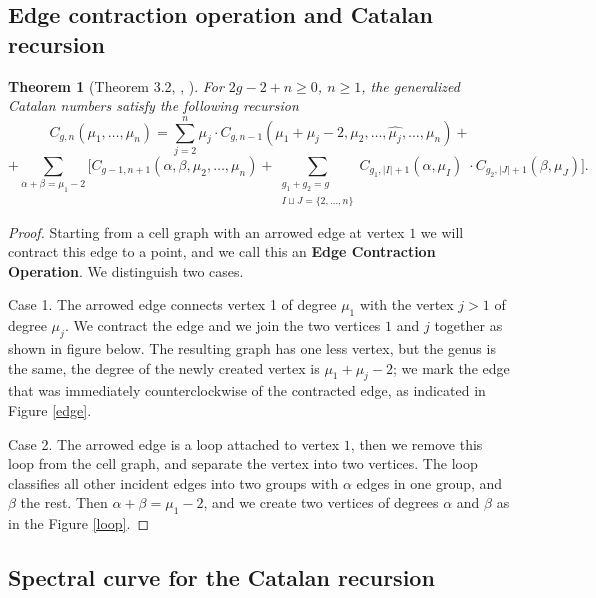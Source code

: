 \documentclass[oneside, 11pt]{amsart}
\newtheorem{thm}{Theorem}[section]
\theoremstyle{definition}
\numberwithin{equation}{subsection}
\def\a{\alpha}
\def\b{\beta}
\begin{document}
\subsection{Edge contraction operation and Catalan recursion}\label{eca cat}
\begin{thm}[Theorem 3.2, \cite{OD6}, \cite{WL}]\label{catalan}
For $2g-2+n\geq 0$, $n\geq 1$, the generalized Catalan numbers satisfy the following recursion
$$C_{g,n}(\mu_1,\dots,\mu_n)=
\sum_{j=2} ^n \mu_j \cdot C_{g,n-1}
(\mu_1+\mu_j-2,\mu_2,\dots,\widehat{\mu_j},
\dots,
\mu_n)+
$$
$$
+
\sum_{\a+\b = \mu_1-2}
\Bigg[
C_{g-1,n+1}(\a,\b,\mu_2,\dots,\mu_n)
+
\sum_{\substack{g_1+g_2=g\\I\sqcup J=\{2,\dots,n\}}}
C_{g_1,|I|+1}(\a,\mu_I)\; \cdot C_{g_2,|J|+1}(\b,\mu_J)
\Bigg].
$$
\end{thm}
\begin{proof} Starting from a cell graph with an arrowed edge at vertex $1$ we will contract this edge to a point, and we call this an \textbf{Edge Contraction Operation}.  We distinguish two cases.

Case 1. The arrowed edge connects vertex 1 of degree $\mu_1$ with the vertex $j > 1$ of degree $\mu_j$. We contract the edge and we join the two vertices $1$ and $j$ together as shown in figure below.
The resulting graph has one less vertex, but the genus is the same, the degree of the newly created vertex is $\mu_{1} + \mu_{j} - 2$; we mark the edge that was immediately
counterclockwise of the contracted edge, as indicated in Figure \ref{edge}.

\begin{figure}[h]
\centering
{}%
\qquad
{}%
\caption{}
\end{figure}


Case 2. The arrowed edge is a loop attached to vertex $1$, then we remove this loop from the cell graph, and separate the vertex into two vertices. The loop classifies all other incident edges into two groups with $\alpha$ edges in one group, and $\beta$ the rest. Then $\alpha + \beta = \mu_{1} - 2$, and we create two vertices of degrees $\alpha$ and $\beta$ as in the Figure \ref{loop}.

\end{proof}

\subsection{Spectral curve for the Catalan recursion}\label{spec curve}
\end{document}

